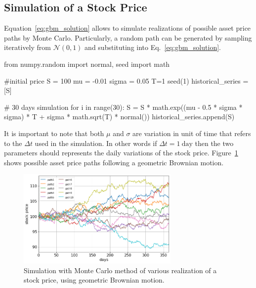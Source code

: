 \subsection{Simulation of a Stock Price}

Equation~\ref{eq:gbm_solution} allows to simulate realizations of possible asset price paths by Monte Carlo. Particularly, a random path can be generated by sampling iteratively from $\mathcal{N}(0,1)$ and substituting into Eq.~\ref{eq:gbm_solution}. 

\begin{ipython}
from numpy.random import normal, seed
import math

#initial price
S = 100
mu = -0.01
sigma = 0.05
T=1
seed(1)
historical_series = [S]

# 30 days simulation
for i in range(30):
    S = S * math.exp((mu - 0.5 * sigma * sigma) * T +
                      sigma * math.sqrt(T) * normal())
    historical_series.append(S)
\end{ipython}

It is important to note that both $\mu$ and $\sigma$ are variation in unit of time that refers to the $\Delta t$ used in the simulation. In other words if $\Delta t = 1~\textrm{day}$ then the two parameters should represents the daily variations of the stock price. Figure~\ref{fig:stock_price_sim} shows possible asset price paths following a geometric Brownian motion. 

\begin{figure}[htb]
\centering
\includegraphics[width=0.7\textwidth]{figures/asset_price_simulation}
\caption{Simulation with Monte Carlo method of various realization of a stock price, using geometric Brownian motion.}
\label{fig:stock_price_sim}
\end{figure}

